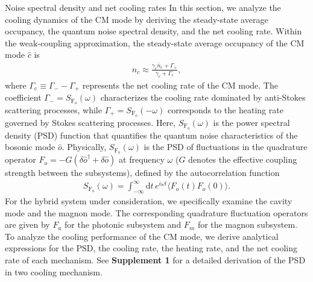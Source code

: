 \documentclass[aps, prresearch, reprint, nofootinbib, longbibliography]{revtex4-2}
\makeatletter
\renewcommand{\thesection}{\Alph{section}}%
\renewcommand{\section}{%
		\secdef{\@Appendix}{\@sAppendix}%
	}%
\newcommand{\@Appendix}[2][?]{%
		\refstepcounter{section}%
		\vspace{0.5em}
		{\centering\large\bfseries Appendix \thesection: #2\par}%
		\addcontentsline{toc}{section}{Appendix \thesection}%
		\markright{Appendix \thesection}%
	}%
\makeatother
\begin{document}
\section{Noise spectral density and net cooling
rates}\label{V}
In this section, we analyze the cooling dynamics of the CM mode by deriving the steady-state average occupancy, the quantum noise spectral density, and the net cooling rate. Within the weak-coupling approximation, the steady-state average occupancy of the CM mode $\hat{c}$ is ~\cite{PhysRevLett99093901,Phys.Rev.A.77033804}
\begin{align}
n_{c} \approx \frac{\gamma_{c} \bar{n}_{c} + \Gamma_{+}}{\gamma_{c} + \Gamma_{\text{c}}},
\label{eq:steady_state_population}
\end{align}
where $\Gamma_{\text{c}} \equiv \Gamma_{-} - \Gamma_{+}$ represents the net cooling rate of the CM mode. The coefficient $\Gamma_{-} = S_\mathrm{F_o}(\omega)$ characterizes the cooling rate dominated by anti-Stokes scattering processes, while $\Gamma_{+} =  S_\mathrm{F_o}(-\omega)$ corresponds to the heating rate governed by Stokes scattering processes.
Here, %
$S_\mathrm{F_o}(\omega)$ is the power spectral density (PSD) function that quantifies the quantum noise characteristics of the bosonic mode $\hat{o}$. Physically, $S_\mathrm{F_o}(\omega)$ is the PSD of fluctuations in the quadrature operator $F_o = -G(\delta \hat{o}^\dagger + \delta \hat{o})$ at frequency $\omega$ ($G$ denotes the effective coupling strength between the subsystems), defined by the autocorrelation function
\begin{align}
S_\mathrm{F_o}(\omega) = \int_{-\infty}^{\infty} \mathrm{d}t \, e^{i \omega t} \langle F_o(t) F_o(0) \rangle.
\label{eq:power_spectral_density}
\end{align}
For the hybrid system under consideration, we specifically examine the cavity mode and the magnon mode. The corresponding quadrature fluctuation operators are given by $F_a$ for the photonic subsystem and $F_m$ for the magnon subsystem.
To analyze the cooling performance of the CM mode, we derive analytical expressions for the PSD, the cooling rate, the heating rate, and the net cooling rate of each mechanism.  See \textbf{Supplement 1} for a detailed
derivation of the PSD in two cooling mechanism.
\end{document}
